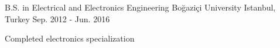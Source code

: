 

\begin{cventries}

    
  \cventry
    {B.S. in Electrical and Electronics Engineering}
    {Boğaziçi University}
    {Istanbul, Turkey}
    {Sep. 2012 - Jun. 2016}
    {
      \begin{cvitems}
        \item {Completed electronics specialization}
      \end{cvitems}
    }       

\end{cventries}
